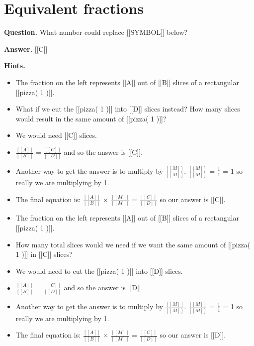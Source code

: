 \documentclass{article}
\begin{document}
\section*{Equivalent fractions}
\textbf{Question.} What number could replace [[SYMBOL]] below?

\textbf{Answer.} [[C]]

\textbf{Hints.}
\begin{itemize}
  \item The fraction on the left represents [[A]] out of [[B]] slices of a rectangular [[pizza( 1 )]].
  \item What if we cut the [[pizza( 1 )]] into [[D]] slices instead? How many slices would result in the same amount of [[pizza( 1 )]]?
  \item We would need [[C]] slices.
  \item $\frac{[[A]]}{[[B]]}$ = $\frac{[[C]]}{[[D]]}$ and so the answer is [[C]].
  \item Another way to get the answer is to multiply by $\frac{[[M]]}{[[M]]}$.
                    $\frac{[[M]]}{[[M]]}$ = $\frac{1}{1}$ = 1 so really we are multiplying by 1.
  \item The final equation is: $\frac{[[A]]}{[[B]]}$ $\times$ $\frac{[[M]]}{[[M]]}$ = $\frac{[[C]]}{[[D]]}$  so our answer is [[C]].
  \item The fraction on the left represents [[A]] out of [[B]] slices of a rectangular [[pizza( 1 )]].
  \item How many total slices would we need if we want the same amount of [[pizza( 1 )]] in [[C]] slices?
  \item We would need to cut the [[pizza( 1 )]] into [[D]] slices.
  \item $\frac{[[A]]}{[[B]]}$ = $\frac{[[C]]}{[[D]]}$ and so the answer is [[D]].
  \item Another way to get the answer is to multiply by $\frac{[[M]]}{[[M]]}$.
                    $\frac{[[M]]}{[[M]]}$ = $\frac{1}{1}$ = 1 so really we are multiplying by 1.
  \item The final equation is: $\frac{[[A]]}{[[B]]}$ $\times$ $\frac{[[M]]}{[[M]]}$ = $\frac{[[C]]}{[[D]]}$  so our answer is [[D]].
\end{itemize}
\end{document}
